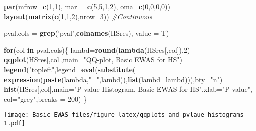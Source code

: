 \documentclass[]{article}
\newenvironment{Shaded}{\begin{snugshade}}{\end{snugshade}}
\newcommand{\KeywordTok}[1]{\textcolor[rgb]{0.13,0.29,0.53}{\textbf{#1}}}
\newcommand{\DataTypeTok}[1]{\textcolor[rgb]{0.13,0.29,0.53}{#1}}
\newcommand{\DecValTok}[1]{\textcolor[rgb]{0.00,0.00,0.81}{#1}}
\newcommand{\StringTok}[1]{\textcolor[rgb]{0.31,0.60,0.02}{#1}}
\newcommand{\CommentTok}[1]{\textcolor[rgb]{0.56,0.35,0.01}{\textit{#1}}}
\newcommand{\ControlFlowTok}[1]{\textcolor[rgb]{0.13,0.29,0.53}{\textbf{#1}}}
\newcommand{\NormalTok}[1]{#1}
\begin{document}
\begin{Shaded}
\begin{Highlighting}[]
\KeywordTok{par}\NormalTok{(}\DataTypeTok{mfrow=}\KeywordTok{c}\NormalTok{(}\DecValTok{1}\NormalTok{,}\DecValTok{1}\NormalTok{), }\DataTypeTok{mar =} \KeywordTok{c}\NormalTok{(}\DecValTok{5}\NormalTok{,}\DecValTok{5}\NormalTok{,}\DecValTok{1}\NormalTok{,}\DecValTok{2}\NormalTok{), }\DataTypeTok{oma=}\KeywordTok{c}\NormalTok{(}\DecValTok{0}\NormalTok{,}\DecValTok{0}\NormalTok{,}\DecValTok{0}\NormalTok{,}\DecValTok{0}\NormalTok{))}
\KeywordTok{layout}\NormalTok{(}\KeywordTok{matrix}\NormalTok{(}\KeywordTok{c}\NormalTok{(}\DecValTok{1}\NormalTok{,}\DecValTok{1}\NormalTok{,}\DecValTok{2}\NormalTok{),}\DataTypeTok{nrow=}\DecValTok{3}\NormalTok{))}
\CommentTok{#Continuous}

\NormalTok{pval.cols =}\StringTok{ }\KeywordTok{grep}\NormalTok{(}\StringTok{'pval'}\NormalTok{,}\KeywordTok{colnames}\NormalTok{(HSres), }\DataTypeTok{value =}\NormalTok{ T)}

\ControlFlowTok{for}\NormalTok{(col }\ControlFlowTok{in}\NormalTok{ pval.cols)\{}
\NormalTok{  lambd=}\KeywordTok{round}\NormalTok{(}\KeywordTok{lambda}\NormalTok{(HSres[,col]),}\DecValTok{2}\NormalTok{)}
  \KeywordTok{qqplot}\NormalTok{(HSres[,col],}\DataTypeTok{main=}\StringTok{"QQ-plot, Basic EWAS for HS"}\NormalTok{)}
  \KeywordTok{legend}\NormalTok{(}\StringTok{"topleft"}\NormalTok{,}\DataTypeTok{legend=}\KeywordTok{eval}\NormalTok{(}\KeywordTok{substitute}\NormalTok{( }\KeywordTok{expression}\NormalTok{(}\KeywordTok{paste}\NormalTok{(lambda,}\StringTok{"="}\NormalTok{,lambd)),}\KeywordTok{list}\NormalTok{(}\DataTypeTok{lambd=}\NormalTok{lambd))),}\DataTypeTok{bty=}\StringTok{"n"}\NormalTok{)}
  \KeywordTok{hist}\NormalTok{(HSres[,col],}\DataTypeTok{main=}\StringTok{"P-value Histogram, Basic EWAS for HS"}\NormalTok{,}\DataTypeTok{xlab=}\StringTok{"P-value"}\NormalTok{,   }
  \DataTypeTok{col=}\StringTok{"grey"}\NormalTok{,}\DataTypeTok{breaks =} \DecValTok{200}\NormalTok{)}
\NormalTok{\}}
\end{Highlighting}
\end{Shaded}

\texttt{[image: Basic\_EWAS\_files/figure-latex/qqplots and pvlaue histograms-1.pdf]}
\end{document}
